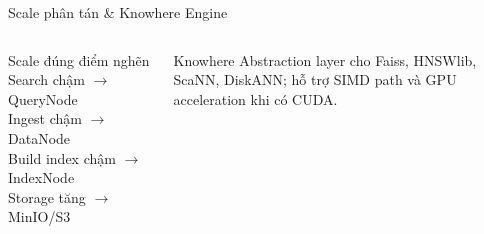 \begin{frame}{Scale phân tán \& Knowhere Engine}
	\begin{columns}
		\begin{block}{Scale đúng điểm nghẽn}
			Search chậm $\rightarrow$ QueryNode\\
			Ingest chậm $\rightarrow$ DataNode\\
			Build index chậm $\rightarrow$ IndexNode\\
			Storage tăng $\rightarrow$ MinIO/S3
		\end{block}
		\begin{exampleblock}{Knowhere}
			Abstraction layer cho Faiss, HNSWlib, ScaNN, DiskANN; hỗ trợ SIMD path và GPU acceleration khi có CUDA.
		\end{exampleblock}
	\end{columns}
\end{frame}

